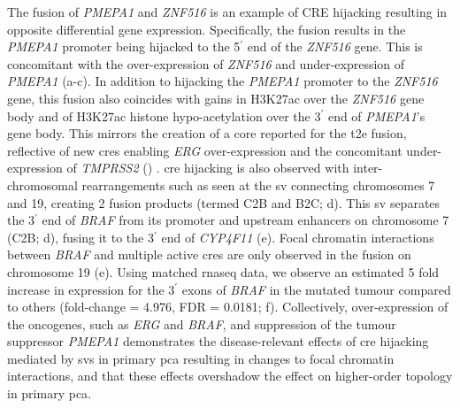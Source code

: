 The fusion of \emph{PMEPA1} and \emph{ZNF516} is an example of CRE hijacking resulting in opposite differential gene expression.
Specifically, the fusion results in the \emph{PMEPA1} promoter being hijacked to the 5$^\prime$ end of the \emph{ZNF516} gene.
This is concomitant with the over-expression of \emph{ZNF516} and under-expression of \emph{PMEPA1} (a-c).
In addition to hijacking the \emph{PMEPA1} promoter to the \emph{ZNF516} gene, this fusion also coincides with gains in H3K27ac over the \emph{ZNF516} gene body and of H3K27ac histone hypo-acetylation over the 3$^\prime$ end of \emph{PMEPA1}'s gene body.
This mirrors the creation of a \gls{core} reported for the \gls{t2e} fusion, reflective of new \glspl{cre} enabling \emph{ERG} over-expression and the concomitant under-expression of \emph{TMPRSS2} () \cite{kronTMPRSS2ERGFusion2017,tomlinsRecurrentFusionTMPRSS22005,tomlinsDistinctClassesChromosomal2007}.
\Gls{cre} hijacking is also observed with inter-chromosomal rearrangements such as seen at the \gls{sv} connecting chromosomes 7 and 19, creating 2 fusion products (termed C2B and B2C; d).
This \gls{sv} separates the 3$^\prime$ end of \emph{BRAF} from its promoter and upstream enhancers on chromosome 7 (C2B; d), fusing it to the 3$^\prime$ end of \emph{CYP4F11} (e).
Focal chromatin interactions between \emph{BRAF} and multiple active \glspl{cre} are only observed in the fusion on chromosome 19 (e).
Using matched \gls{rnaseq} data, we observe an estimated 5 fold increase in expression for the 3$^\prime$ exons of \emph{BRAF} in the mutated tumour compared to others (fold-change = 4.976, FDR = 0.0181; f).
Collectively, over-expression of the oncogenes, such as \emph{ERG} and \emph{BRAF}, and suppression of the tumour suppressor \emph{PMEPA1} demonstrates the disease-relevant effects of \gls{cre} hijacking mediated by \glspl{sv} in primary \gls{pca} resulting in changes to focal chromatin interactions, and that these effects overshadow the effect on higher-order topology in primary \gls{pca}.

